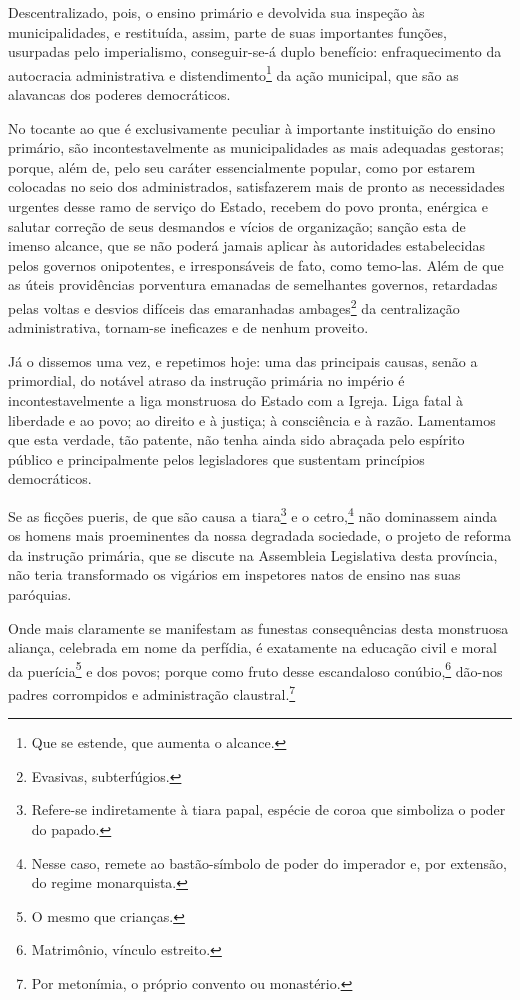 Descentralizado, pois, o ensino primário e devolvida sua inspeção às
municipalidades, e restituída, assim, parte de suas importantes funções,
usurpadas pelo imperialismo, conseguir-se-á duplo benefício:
enfraquecimento da autocracia administrativa e distendimento\footnote{
  Que se estende, que aumenta o alcance.} da ação municipal, que são as
alavancas dos poderes democráticos.

No tocante ao que é exclusivamente peculiar à importante instituição do
ensino primário, são incontestavelmente as municipalidades as mais
adequadas gestoras; porque, além de, pelo seu caráter essencialmente
popular, como por estarem colocadas no seio dos administrados,
satisfazerem mais de pronto as necessidades urgentes desse ramo de
serviço do Estado, recebem do povo pronta, enérgica e salutar correção
de seus desmandos e vícios de organização; sanção esta de imenso
alcance, que se não poderá jamais aplicar às autoridades estabelecidas
pelos governos onipotentes, e irresponsáveis de fato, como temo-las.
Além de que as úteis providências porventura emanadas de semelhantes
governos, retardadas pelas voltas e desvios difíceis das emaranhadas
ambages\footnote{Evasivas, subterfúgios.} da centralização
administrativa, tornam-se ineficazes e de nenhum proveito.

Já o dissemos uma vez, e repetimos hoje: uma das principais causas,
senão a primordial, do notável atraso da instrução primária no império é
incontestavelmente a liga monstruosa do Estado com a Igreja. Liga fatal
à liberdade e ao povo; ao direito e à justiça; à consciência e à razão.
Lamentamos que esta verdade, tão patente, não tenha ainda sido abraçada
pelo espírito público e principalmente pelos legisladores que sustentam
princípios democráticos.

Se as ficções pueris, de que são causa a tiara\footnote{Refere-se
  indiretamente à tiara papal, espécie de coroa que simboliza o poder do
  papado.} e o cetro,\footnote{Nesse caso, remete ao bastão-símbolo de
  poder do imperador e, por extensão, do regime monarquista.} não
dominassem ainda os homens mais proeminentes da nossa degradada
sociedade, o projeto de reforma da instrução primária, que se discute na
Assembleia Legislativa desta província, não teria transformado os
vigários em inspetores natos de ensino nas suas paróquias.

Onde mais claramente se manifestam as funestas consequências desta
monstruosa aliança, celebrada em nome da perfídia, é exatamente na
educação civil e moral da puerícia\footnote{O mesmo que crianças.} e
dos povos; porque como fruto desse escandaloso conúbio,\footnote{
  Matrimônio, vínculo estreito.} dão-nos padres corrompidos e
administração claustral.\footnote{Por metonímia, o próprio convento ou
  monastério.}

